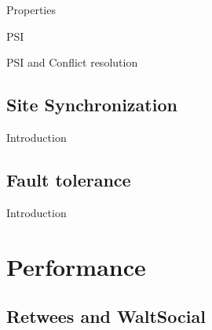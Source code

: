 \documentclass{beamer}
\begin{document}
		\begin{frame}{Properties}
		
		
		\end{frame}		
		
		\begin{frame}{PSI}

		
		\end{frame}
		
		\begin{frame}{PSI and Conflict resolution}
		
		
		\end{frame}
 	
	\subsection{Site Synchronization}
	 	
	 	
		\begin{frame}{Introduction}
				

		\end{frame}	 	
 	
	\subsection{Fault tolerance}	
	 	
 	
		\begin{frame}{Introduction}
				

		\end{frame}	 	 	
 	
\section{Performance}

	\subsection{Retwees and WaltSocial}	
\end{document}
